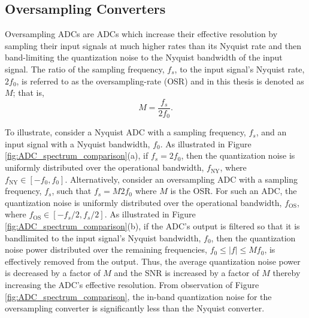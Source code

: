 \subsection{Oversampling Converters}
Oversampling ADCs are ADCs which increase their effective resolution by
sampling their input signals at much higher rates than its Nyquist rate and
then band-limiting the quantization noise to the Nyquist bandwidth of the input signal.
The ratio of the sampling frequency, $f_s$, to the input signal's Nyquist rate, $2f_0$, is
referred to as the oversampling-rate (OSR) and in this thesis is denoted as $M$; that is, 
\begin{equation}\label{eq:OSR}
 M=\frac{f_{s}}{2f_{0}}\text{.}
\end{equation}

To illustrate, consider a Nyquist ADC with a sampling frequency, $f_s$, and an input
signal with a Nyquist bandwidth, $f_0$. As illustrated in Figure
\ref{fig:ADC_spectrum_comparison}(a), if $f_s=2f_0$, then the quantization noise is
uniformly distributed over the operational bandwidth, $f_\text{NY}$, where
$f_\text{NY}\in\left[-f_0,f_0\right]$. Alternatively, consider an oversampling ADC with a
sampling frequency, $f_s$, such that $f_s=M2f_0$ where $M$ is the OSR. For such an ADC,
the quantization noise is uniformly distributed over the operational bandwidth,
$f_{\text{OS}}$, where $f_\text{OS}\in \left[-f_s/2, f_s/2\right]$. As illustrated in
Figure \ref{fig:ADC_spectrum_comparison}(b), if the ADC's output is filtered so that it is
bandlimited to the input signal's Nyquist bandwidth, $f_0$, then the quantization noise
power distributed over the remaining frequencies, $f_0\leq\lvert f\rvert\leq Mf_0$, is
effectively removed from the output. Thus, the average quantization noise power is
decreased by a factor of $M$ and the SNR is increased by a factor of $M$ thereby
increasing the ADC's effective resolution. From observation of Figure
\ref{fig:ADC_spectrum_comparison}, the in-band quantization noise for the oversampling
converter is significantly less than the Nyquist converter.

